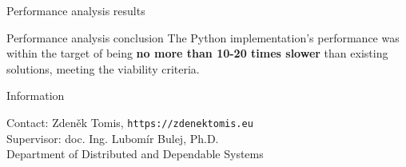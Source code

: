 \documentclass[portrait,a0paper,fontscale=0.25]{baposter}
\begin{document}
\begin{poster}
\begin{posterbox}[column=1, name=result1]{Performance analysis results}


\begin{center}
	
\end{center}


\begin{center}

\end{center}


\begin{center}
	
\end{center}


\begin{center}

\end{center}

\end{posterbox}


\begin{posterbox}[column=1, name=conclusion, below=result1, bottomaligned=summary]{Performance analysis conclusion}
	The Python implementation's performance was within the target of being  \textbf{no more than 10-20 times slower} than existing solutions, meeting the viability criteria.
\end{posterbox}



\begin{posterbox}[column=0, name=footer, below=summary,span=2]{Information}
	\begin{multicols}{2}
		\raggedright
		Contact: Zdeněk Tomis, \texttt{https://zdenektomis.eu} \\
        Supervisor: doc. Ing. Lubomír Bulej, Ph.D. \\
        Department of Distributed and Dependable Systems \\
		\columnbreak
		\centering


			\raisebox{10em}{
		
				 
			}
		

	\end{multicols}

\end{posterbox}

\end{poster}
\end{document}
